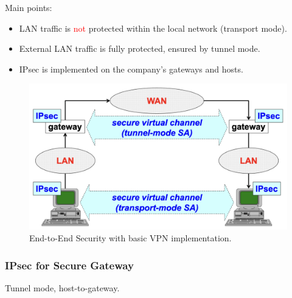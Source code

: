 \begin{multicols}{2}
\raggedcolumns

    Main points:
    \begin{itemize}
        \item LAN traffic is \textcolor{red}{not} protected within the local network (transport mode).
        \item External LAN traffic is fully protected, ensured by tunnel mode.
        \item IPsec is implemented on the company's gateways and hosts.
        \end{itemize}
\columnbreak

\begin{figure}[H]
    \centering
    \includegraphics[width=\linewidth]{Images/NetSec/end_vpn.png}
    \caption{End-to-End Security with basic VPN implementation.}
    \label{fig:end_vpn}
\end{figure}
\end{multicols}

\subsubsection{IPsec for Secure Gateway}
\begin{center}
    Tunnel mode, host-to-gateway.
\end{center}

